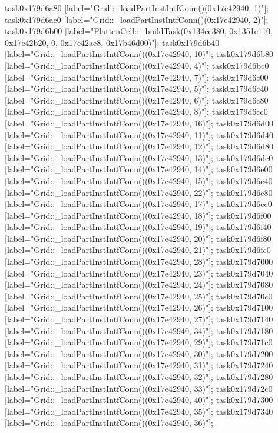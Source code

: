 {	task0x179d6a80 [label="Grid::_loadPartInstIntfConn()(0x17e42940, 1)"];
	task0x179d6ac0 [label="Grid::_loadPartInstIntfConn()(0x17e42940, 2)"];
	task0x179d6b00 [label="FlattenCell::_buildTask(0x134ce380, 0x1351e110, 0x17e42b20, 0, 0x17e42ae8, 0x17b46d00)"];
	task0x179d6b40 [label="Grid::_loadPartInstIntfConn()(0x17e42940, 10)"];
	task0x179d6b80 [label="Grid::_loadPartInstIntfConn()(0x17e42940, 4)"];
	task0x179d6bc0 [label="Grid::_loadPartInstIntfConn()(0x17e42940, 7)"];
	task0x179d6c00 [label="Grid::_loadPartInstIntfConn()(0x17e42940, 5)"];
	task0x179d6c40 [label="Grid::_loadPartInstIntfConn()(0x17e42940, 6)"];
	task0x179d6c80 [label="Grid::_loadPartInstIntfConn()(0x17e42940, 8)"];
	task0x179d6cc0 [label="Grid::_loadPartInstIntfConn()(0x17e42940, 16)"];
	task0x179d6d00 [label="Grid::_loadPartInstIntfConn()(0x17e42940, 11)"];
	task0x179d6d40 [label="Grid::_loadPartInstIntfConn()(0x17e42940, 12)"];
	task0x179d6d80 [label="Grid::_loadPartInstIntfConn()(0x17e42940, 13)"];
	task0x179d6dc0 [label="Grid::_loadPartInstIntfConn()(0x17e42940, 14)"];
	task0x179d6e00 [label="Grid::_loadPartInstIntfConn()(0x17e42940, 15)"];
	task0x179d6e40 [label="Grid::_loadPartInstIntfConn()(0x17e42940, 22)"];
	task0x179d6e80 [label="Grid::_loadPartInstIntfConn()(0x17e42940, 17)"];
	task0x179d6ec0 [label="Grid::_loadPartInstIntfConn()(0x17e42940, 18)"];
	task0x179d6f00 [label="Grid::_loadPartInstIntfConn()(0x17e42940, 19)"];
	task0x179d6f40 [label="Grid::_loadPartInstIntfConn()(0x17e42940, 20)"];
	task0x179d6f80 [label="Grid::_loadPartInstIntfConn()(0x17e42940, 21)"];
	task0x179d6fc0 [label="Grid::_loadPartInstIntfConn()(0x17e42940, 28)"];
	task0x179d7000 [label="Grid::_loadPartInstIntfConn()(0x17e42940, 23)"];
	task0x179d7040 [label="Grid::_loadPartInstIntfConn()(0x17e42940, 24)"];
	task0x179d7080 [label="Grid::_loadPartInstIntfConn()(0x17e42940, 25)"];
	task0x179d70c0 [label="Grid::_loadPartInstIntfConn()(0x17e42940, 26)"];
	task0x179d7100 [label="Grid::_loadPartInstIntfConn()(0x17e42940, 27)"];
	task0x179d7140 [label="Grid::_loadPartInstIntfConn()(0x17e42940, 34)"];
	task0x179d7180 [label="Grid::_loadPartInstIntfConn()(0x17e42940, 29)"];
	task0x179d71c0 [label="Grid::_loadPartInstIntfConn()(0x17e42940, 30)"];
	task0x179d7200 [label="Grid::_loadPartInstIntfConn()(0x17e42940, 31)"];
	task0x179d7240 [label="Grid::_loadPartInstIntfConn()(0x17e42940, 32)"];
	task0x179d7280 [label="Grid::_loadPartInstIntfConn()(0x17e42940, 33)"];
	task0x179d72c0 [label="Grid::_loadPartInstIntfConn()(0x17e42940, 40)"];
	task0x179d7300 [label="Grid::_loadPartInstIntfConn()(0x17e42940, 35)"];
	task0x179d7340 [label="Grid::_loadPartInstIntfConn()(0x17e42940, 36)"];
}
